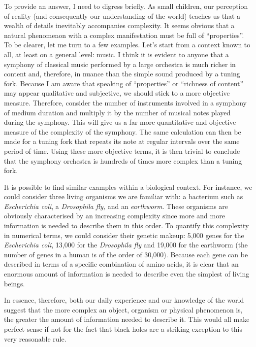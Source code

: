 To provide an answer, I need to digress briefly. As small children, our
perception of reality (and consequently our understanding of the
world) teaches us that a wealth of details inevitably accompanies complexity. It seems
obvious that a natural phenomenon with a complex manifestation must be full of
``properties''. To be clearer, let me turn to a few examples. Let's start from a context
known to all, at least on a general level: music. I think it is evident to anyone that a
symphony of classical music performed by a large orchestra is much richer in content
and, therefore, in nuance than the simple sound produced by a tuning fork. Because I am
aware that speaking of ``properties'' or ``richness of content'' may appear qualitative
and subjective, we should stick to a more objective measure. Therefore, consider the
number of instruments involved in a symphony of medium duration and multiply it by the
number of musical notes played during the symphony. This will give us a far more
quantitative and objective measure of the complexity of the symphony. The same
calculation can then be made for a tuning fork that repeats its note at regular
intervals over the same period of time. Using these more objective terms, it is then
trivial to conclude that the symphony orchestra is hundreds of times more complex than a
tuning fork.

It is possible to find similar examples within a biological context. For instance, we
could consider three living organisms we are familiar with: a bacterium such as
\emph{Escherichia coli}, a \emph{Drosophila fly,} and an \emph{earthworm}. These
organisms are obviously characterised by an increasing complexity since more and more
information is needed to describe them in this order. To quantify this complexity in
numerical terms, we could consider their genetic makeup: 5,000 genes for the
\emph{Escherichia coli}, 13,000 for the \emph{Drosophila fly} and 19,000 for the
earthworm (the number of genes in a human is of the order of 30,000). Because each gene
can be described in terms of a specific combination of amino acids, it is clear that an
enormous amount of information is needed to describe even the simplest of living beings.

In essence, therefore, both our daily experience and our knowledge of the world suggest
that the more complex an object, organism or physical phenomenon is, the greater the
amount of information needed to describe it. This would all make perfect sense if not
for the fact that black holes are a striking exception to this very reasonable rule.

